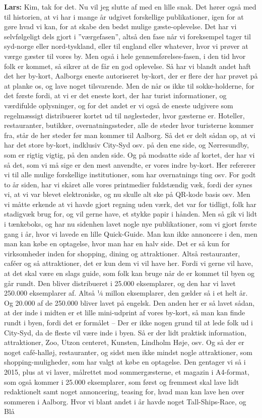 \textbf{Lars:} Kim, tak for det. Nu vil jeg slutte af med en lille snak. Det hører også med til historien, at vi har i mange år udgivet forskellige publikationer, igen for at gøre hvad vi kan, for at skabe den bedst mulige gæste-oplevelse. Det har vi selvfølgeligt dels gjort i ”værgefasen”, altså den fase når vi foreksempel tager til syd-norge eller nord-tyskland, eller til england eller whatever, hvor vi prøver at værge gæster til vores by. Men også i hele gennemførelses-fasen, i den tid hvor folk er kommet, så sikrer at de får en god oplevelse. Så har vi blandt andet haft det her by-kort, Aalborgs eneste autoriseret by-kort, der er flere der har prøvet på at planke os, og lave noget tilsvarende. Men de når os ikke til sokke-holderne, for det første fordi, at vi er det eneste kort, der har turist informationer, og værdifulde oplysninger, og for det andet er vi også de eneste udgivere som regelmæssigt distribuerer kortet ud til nøglesteder, hvor gæsterne er. Hoteller, restauranter, butikker, overnatningssteder, alle de steder hvor turisterne kommer fra, står de her steder før man kommer til Aalborg. Så det er delt sådan op, at vi har det store by-kort, indklusiv City-Syd osv. på den ene side, og Nørresundby, som er rigtig vigtig, på den anden side. Og på modsatte side af kortet, der har vi så det, som vi må sige er den mest anvendte, er vores indre by-kort. Her refererer vi til alle mulige forskellige institutioner, som har overnatnings ting osv. For godt to år siden, har vi skåret alle vores printmedier fuldstændig væk, fordi  der synes vi, at vi var blevet elektroniske, og nu skulle alt ske på QR-kode basis osv. Men vi måtte erkende at vi havde gjort regning uden værk, det var for tidligt, folk har stadigvæk brug for, og vil gerne have, et stykke papir i hånden. Men så gik vi lidt i tænkeboks, og har nu sidenhen lavet nogle nye publikationer, som vi gjort første gang i år, hvor vi lavede en lille Quick-Guide. Man kan ikke annoncere i den, men man kan købe en optagelse, hvor man har en halv side. Det er så kun for virksomheder inden for shopping, dining og attraktioner. Altså restauranter, caféer og så attraktioner, det er kun dem vi vil have her. Fordi vi gerne vil have, at det skal være en slags guide, som folk kan bruge når de er kommet til byen og går rundt. Den bliver distribueret i 25.000 eksemplarer, og den har vi lavet 250.000 eksemplarer af. Altså ¼ millon eksemplarer, den gælder så i et helt år. Og 20.000 af de 250.000 bliver lavet på engelsk. Den anden her er så lavet sådan, at der inde i midten er et lille mini-udprint af vores by-kort, så man kan finde rundt i byen, fordi det er formålet – Der er ikke nogen grund til at lede folk ud i City-Syd, da de fleste vil være inde i byen. Så er der lidt praktisk information, attraktioner, Zoo, Utzon centeret, Kunsten, Lindholm Høje, osv. Og så der er noget café-halløj, restauranter, og sidst men ikke mindst nogle attraktioner, som shopping-muligheder, som har valgt at købe en optagelse. Den gentager vi så i 2015, plus at vi laver, målrettet mod sommergæsterne, et magazin i A4-format, som også kommer i 25.000 eksemplarer, som først og fremmest skal lave lidt redaktionelt samt noget annoncering, teasing for, hvad man kan lave hen over sommeren i Aalborg. Hvor vi blant andet i år havde noget Tall-Ships-Race, og Blå 